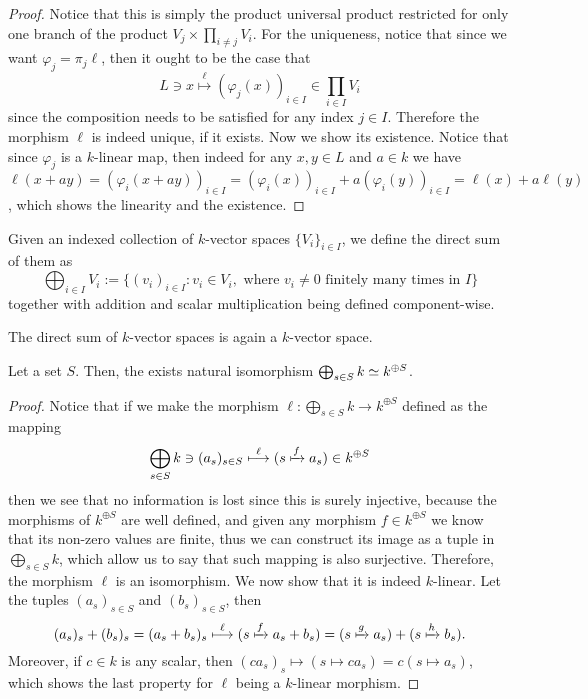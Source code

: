 \begin{proof}
   Notice that this is simply the product universal product restricted for only
   one branch of the product \(V_j \times \prod_{i \neq j} V_i\). For the
   uniqueness, notice that since we want \(\varphi_j = \pi_j  \ell\), then
   it ought to be the case that
   \[
      L \ni x \overset{\ell}\longmapsto (\varphi_j(x))_{i \in I} \in \prod_{i
      \in I} V_i
   \]
   since the composition needs to be satisfied for any index \(j \in I\).
   Therefore the morphism \(\ell\) is indeed unique, if it exists. Now we show
   its existence. Notice that since \(\varphi_j\) is a \(k\)-linear map, then
   indeed for any \(x, y \in L\) and \(a \in k\) we have \(\ell(x + ay) =
   (\varphi_i(x + ay))_{i \in I} = (\varphi_i(x))_{i \in I} + a
   (\varphi_i(y))_{i \in I} = \ell(x) + a \ell(y)\), which shows the linearity
   and the existence.
\end{proof}

\begin{definition}
   Given an indexed collection of \(k\)-vector spaces \(\{V_i\}_{i \in I}\), we
   define the direct sum of them as
   \[
      \bigoplus _{i \in I} V_i := \{(v_i)_{i \in I} : v_i \in V_i, \text{ where
      } v_i \neq 0 \text{ finitely many times in } I\}
   \]
   together with addition and scalar multiplication being defined component-wise.
\end{definition}

\begin{proposition}
   The direct sum of \(k\)-vector spaces is again a \(k\)-vector space.
\end{proposition}

\begin{proposition}
   Let a set \(S\). Then, the exists natural isomorphism \(\bigoplus_{s \in S} k
   \simeq k^{\oplus S}\).
\end{proposition}

\begin{proof}
   Notice that if we make the morphism \(\ell : \bigoplus_{s \in S} k \to
   k^{\oplus S}\) defined as the mapping
   \[
      \bigoplus_{s \in S} k \ni (a_s)_{s \in S} \overset{\ell}\longmapsto (s
      \xmapsto{f} a_s) \in k^{\oplus S}
   \]
   then we see that no information is lost since this is surely injective,
   because the morphisms of \(k^{\oplus S}\) are well defined, and given any
   morphism \(f \in k^{\oplus S}\) we know that its non-zero values are finite,
   thus we can construct its image as a tuple in \(\bigoplus_{s \in S} k\),
   which allow us to say that such mapping is also surjective. Therefore, the
   morphism \(\ell\) is an isomorphism. We now show that it is indeed
   \(k\)-linear. Let the tuples \((a_s)_{s \in S}\) and \((b_s)_{s \in S}\),
   then
   \[
      (a_s)_s + (b_s)_s = (a_s + b_s)_s \overset \ell \longmapsto (s \xmapsto f
      a_s + b_s) = (s \xmapsto g a_s) + (s \xmapsto h b_s).
   \]
   Moreover, if \(c \in k\) is any scalar, then \((c a_s)_s \longmapsto (s
   \mapsto c a_s) = c (s \mapsto a_s)\), which shows the last property for
   \(\ell\) being a \(k\)-linear morphism.
\end{proof}

